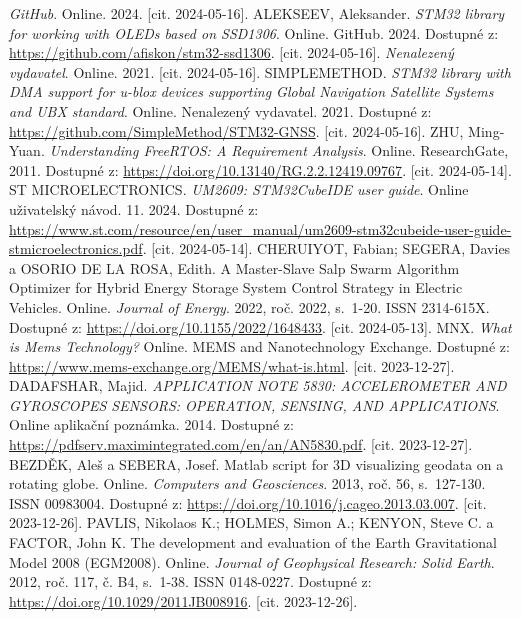 \begin{thebibliography}{29}

\textit{GitHub}. Online. 2024. [cit. 2024-05-16].
ALEKSEEV, Aleksander. \textit{STM32 library for working with OLEDs based on SSD1306}. Online. GitHub. 2024. Dostupné z: \url{https://github.com/afiskon/stm32-ssd1306}. [cit. 2024-05-16].
\textit{Nenalezený vydavatel}. Online. 2021. [cit. 2024-05-16].
SIMPLEMETHOD. \textit{STM32 library with DMA support for u-blox devices supporting Global Navigation Satellite Systems and UBX standard}. Online. Nenalezený vydavatel. 2021. Dostupné z: \url{https://github.com/SimpleMethod/STM32-GNSS}. [cit. 2024-05-16].
ZHU, Ming-Yuan. \textit{Understanding FreeRTOS: A Requirement Analysis}. Online. ResearchGate, 2011. Dostupné z: \url{https://doi.org/10.13140/RG.2.2.12419.09767}. [cit. 2024-05-14].
ST MICROELECTRONICS. \textit{UM2609: STM32CubeIDE user guide}. Online uživatelský návod. 11. 2024. Dostupné z: \url{https://www.st.com/resource/en/user\_manual/um2609-stm32cubeide-user-guide-stmicroelectronics.pdf}. [cit. 2024-05-14].
CHERUIYOT, Fabian; SEGERA, Davies a OSORIO DE LA ROSA, Edith. A Master-Slave Salp Swarm Algorithm Optimizer for Hybrid Energy Storage System Control Strategy in Electric Vehicles. Online. \textit{Journal of Energy}. 2022, roč. 2022, s.~1-20. ISSN 2314-615X. Dostupné z: \url{https://doi.org/10.1155/2022/1648433}. [cit. 2024-05-13].
MNX. \textit{What is Mems Technology?} Online. MEMS and Nanotechnology Exchange. Dostupné z: \url{https://www.mems-exchange.org/MEMS/what-is.html}. [cit. 2023-12-27].
DADAFSHAR, Majid. \textit{APPLICATION NOTE 5830: ACCELEROMETER AND GYROSCOPES SENSORS: OPERATION, SENSING, AND APPLICATIONS}. Online aplikační poznámka. 2014. Dostupné z: \url{https://pdfserv.maximintegrated.com/en/an/AN5830.pdf}. [cit. 2023-12-27].
BEZDĚK, Aleš a SEBERA, Josef. Matlab script for 3D visualizing geodata on a rotating globe. Online. \textit{Computers and Geosciences}. 2013, roč. 56, s.~127-130. ISSN 00983004. Dostupné z: \url{https://doi.org/10.1016/j.cageo.2013.03.007}. [cit. 2023-12-26].
PAVLIS, Nikolaos K.; HOLMES, Simon A.; KENYON, Steve C. a FACTOR, John K. The development and evaluation of the Earth Gravitational Model 2008 (EGM2008). Online. \textit{Journal of Geophysical Research: Solid Earth}. 2012, roč. 117, č. B4, s.~1-38. ISSN 0148-0227. Dostupné z: \url{https://doi.org/10.1029/2011JB008916}. [cit. 2023-12-26].

\end{thebibliography}
